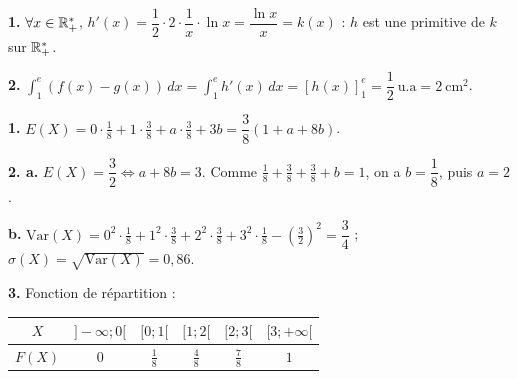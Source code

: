 \documentclass[11pt]{article}
\begin{document}
\textbf{1.} $\forall x \in \mathbb{R}_+^*$, $h'(x) = \dfrac{1}{2}\cdot 2\cdot\dfrac{1}{x}\cdot\ln x = \dfrac{\ln x}{x} = k(x)$ : $h$ est une primitive de $k$ sur $\mathbb{R}_+^*$.

\textbf{2.} $\displaystyle\int_1^e (f(x) - g(x))\,dx = \int_1^e h'(x)\,dx = [h(x)]_1^e = \dfrac{1}{2}\ \text{u.a} = 2\ \text{cm}^2$.

\textbf{1.} $E(X) = 0\cdot\tfrac{1}{8} + 1\cdot\tfrac{3}{8} + a\cdot\tfrac{3}{8} + 3b = \dfrac{3}{8}(1 + a + 8b)$.

\textbf{2. a.} $E(X) = \dfrac{3}{2} \Leftrightarrow a + 8b = 3$. Comme $\tfrac{1}{8} + \tfrac{3}{8} + \tfrac{3}{8} + b = 1$, on a $b = \dfrac{1}{8}$, puis $a = 2$.

\textbf{b.} $\mathrm{Var}(X) = 0^2\cdot\tfrac{1}{8} + 1^2\cdot\tfrac{3}{8} + 2^2\cdot\tfrac{3}{8} + 3^2\cdot\tfrac{1}{8} - \left(\tfrac{3}{2}\right)^2 = \dfrac{3}{4}$ ; $\sigma(X) = \sqrt{\mathrm{Var}(X)} = 0{,}86$.

\textbf{3.} Fonction de répartition :
\begin{center}\renewcommand{\arraystretch}{1.5}
\begin{tabular}{|c|c|c|c|c|c|}
\hline $X$ & $]-\infty;0[$ & $[0;1[$ & $[1;2[$ & $[2;3[$ & $[3;+\infty[$ \\\hline $F(X)$ & $0$ & $\frac{1}{8}$ & $\frac{4}{8}$ & $\frac{7}{8}$ & $1$ \\\hline
\end{tabular}
\end{center}
\end{document}
